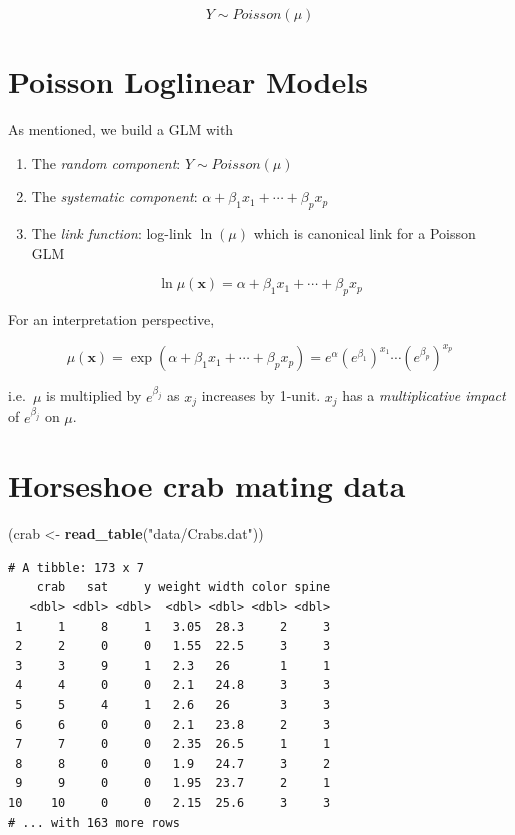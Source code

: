 \documentclass[]{book}
\newenvironment{Shaded}{\begin{snugshade}}{\end{snugshade}}
\newcommand{\KeywordTok}[1]{\textcolor[rgb]{0.13,0.29,0.53}{\textbf{#1}}}
\newcommand{\NormalTok}[1]{#1}
\newcommand{\StringTok}[1]{\textcolor[rgb]{0.31,0.60,0.02}{#1}}
\providecommand{\tightlist}{%
  \setlength{\itemsep}{0pt}\setlength{\parskip}{0pt}}
\begin{document}
\[Y \sim Poisson(\mu)\]

\hypertarget{poisson-loglinear-models}{%
\section{Poisson Loglinear Models}\label{poisson-loglinear-models}}

As mentioned, we build a GLM with

\begin{enumerate}
\def\labelenumi{\arabic{enumi}.}
\tightlist
\item
  The \emph{random component}: \(Y \sim Poisson(\mu)\)
\item
  The \emph{systematic component}: \(\alpha + \beta_1 x_1 + \cdots + \beta_p x_p\)
\item
  The \emph{link function}: log-link \(\ln(\mu)\) which is canonical link for a Poisson GLM
\end{enumerate}

\[\ln\mu(\mathbf{x}) = \alpha + \beta_1x_1 + \cdots + \beta_px_p\]

For an interpretation perspective,

\[\mu(\mathbf{x}) = \exp(\alpha + \beta_1x_1 + \cdots + \beta_px_p) = e^\alpha(e^{\beta_1})^{x_1}\cdots(e^{\beta_p})^{x_p}\]

i.e.~\(\mu\) is multiplied by \(e^{\beta_j}\) as \(x_j\) increases by 1-unit. \(x_j\) has a \emph{multiplicative impact} of \(e^{\beta_j}\) on \(\mu\).

\hypertarget{horseshoe-crab-mating-data}{%
\section{Horseshoe crab mating data}\label{horseshoe-crab-mating-data}}

\begin{Shaded}
\begin{Highlighting}[]
\NormalTok{(crab <-}\StringTok{ }\KeywordTok{read_table}\NormalTok{(}\StringTok{"data/Crabs.dat"}\NormalTok{))}
\end{Highlighting}
\end{Shaded}

\begin{verbatim}
# A tibble: 173 x 7
    crab   sat     y weight width color spine
   <dbl> <dbl> <dbl>  <dbl> <dbl> <dbl> <dbl>
 1     1     8     1   3.05  28.3     2     3
 2     2     0     0   1.55  22.5     3     3
 3     3     9     1   2.3   26       1     1
 4     4     0     0   2.1   24.8     3     3
 5     5     4     1   2.6   26       3     3
 6     6     0     0   2.1   23.8     2     3
 7     7     0     0   2.35  26.5     1     1
 8     8     0     0   1.9   24.7     3     2
 9     9     0     0   1.95  23.7     2     1
10    10     0     0   2.15  25.6     3     3
# ... with 163 more rows
\end{verbatim}
\end{document}
